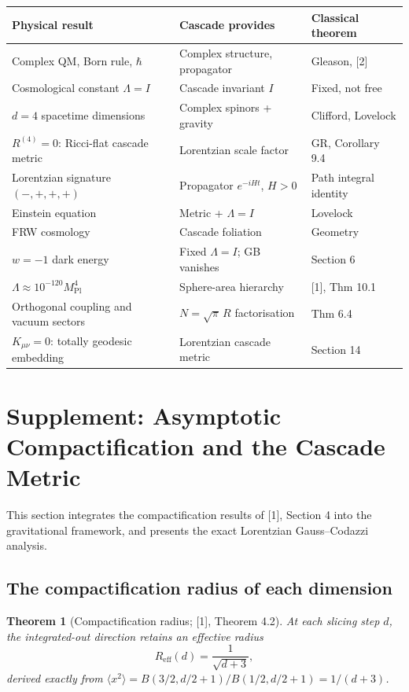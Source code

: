 \documentclass[12pt,a4paper]{article}
\newtheorem{theorem}{Theorem}[section]
\begin{document}
\begin{center}
\small
\begin{tabular}{lll}
\hline
Physical result & Cascade provides & Classical theorem \\
\hline
Complex QM, Born rule, $\hbar$ & Complex structure, propagator & Gleason, [2] \\
Cosmological constant $\Lambda = I$ & Cascade invariant $I$ & Fixed, not free \\
$d = 4$ spacetime dimensions & Complex spinors + gravity & Clifford, Lovelock \\
$R^{(4)} = 0$: Ricci-flat cascade metric & Lorentzian scale factor & GR, Corollary 9.4 \\
Lorentzian signature $(-,+,+,+)$ & Propagator $e^{-iHt}$, $H > 0$ & Path integral identity \\
Einstein equation & Metric + $\Lambda = I$ & Lovelock \\
FRW cosmology & Cascade foliation & Geometry \\
$w = -1$ dark energy & Fixed $\Lambda = I$; GB vanishes & Section 6 \\
$\Lambda \approx 10^{-120}M_{\text{Pl}}^4$ & Sphere-area hierarchy & [1], Thm 10.1 \\
Orthogonal coupling and vacuum sectors & $N = \sqrt{\pi}\,R$ factorisation & Thm 6.4 \\
$K_{\mu\nu} = 0$: totally geodesic embedding & Lorentzian cascade metric & Section 14 \\
\hline
\end{tabular}
\end{center}

\section{Supplement: Asymptotic Compactification and the Cascade Metric}

This section integrates the compactification results of [1], Section 4 into the gravitational
framework, and presents the exact Lorentzian Gauss--Codazzi analysis.

\subsection{The compactification radius of each dimension}

\begin{theorem}[Compactification radius; {[1]}, Theorem 4.2]
At each slicing step $d$, the
integrated-out direction retains an effective radius
\[
R_{\text{eff}}(d) = \frac{1}{\sqrt{d + 3}},
\]
derived exactly from $\langle x^2 \rangle = B(3/2, d/2 + 1)/B(1/2, d/2 + 1) = 1/(d + 3)$.
\end{theorem}
\end{document}
